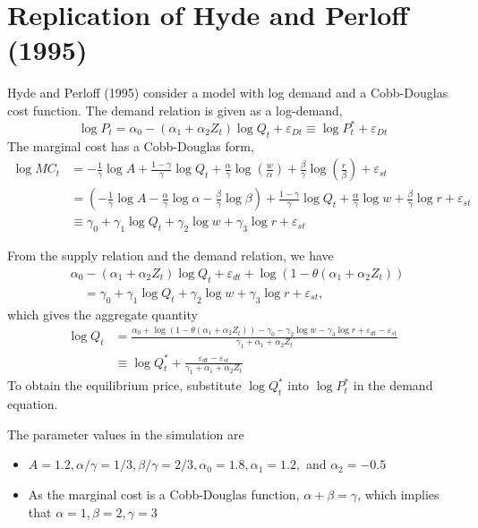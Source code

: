 \documentclass[11pt]{article}
\numberwithin{figure}{section}
\theoremstyle{definition}
\newcommand{\0}{\mathbf{0}}
\begin{document}
\section{Replication of Hyde and Perloff (1995)}
Hyde and Perloff (1995) consider a model with log demand and a Cobb-Douglas cost function. 
The demand relation is given as a log-demand, 
\[\log P_{t} = \alpha_0 - (\alpha_1 + \alpha_2 Z_t) \log Q_t + \varepsilon_{Dt} \equiv \log P_t^* + \varepsilon_{Dt}\]
The marginal cost has a Cobb-Douglas form,
\begin{align*}
    \log MC_t &= -\frac{1}{\gamma}\log A + \frac{1-\gamma}{\gamma}\log Q_t + \frac{\alpha}{\gamma} \log \left(\frac{w}{\alpha}\right) + \frac{\beta}{\gamma} \log \left(\frac{r}{\beta}\right) + \varepsilon_{st}\\
        & = \left( -\frac{1}{\gamma}\log A - \frac{\alpha}{\gamma}\log \alpha -  \frac{\beta}{\gamma}\log\beta    \right) + \frac{1-\gamma}{\gamma}\log Q_t + \frac{\alpha}{\gamma} \log w + \frac{\beta}{\gamma} \log r + \varepsilon_{st} \\
        &\equiv \gamma_0 + \gamma_1 \log Q_t +  \gamma_2 \log w + \gamma_3 \log r + \varepsilon_{st}
\end{align*}

From the supply relation and the demand relation, we have
\begin{align*}
   &\alpha_0 - (\alpha_1 + \alpha_2 Z_t)\log Q_t + \varepsilon_{dt} + \log (1 - \theta (\alpha_1 + \alpha_2 Z_t))\\
   &\quad = \gamma_0 + \gamma_1 \log Q_t +  \gamma_2 \log w + \gamma_3 \log r + \varepsilon_{st},
\end{align*}
which gives the aggregate quantity 
\begin{align*}
    \log Q_t &= \frac{ \alpha_0 + \log (1 - \theta (\alpha_1 + \alpha_2 Z_t)) - \gamma_0  -  \gamma_2 \log w - \gamma_3 \log r +  \varepsilon_{dt} - \varepsilon_{st}}{\gamma_1+ \alpha_1 + \alpha_2 Z_t}\\
    &\equiv \log Q_t^* + \frac{\varepsilon_{dt} - \varepsilon_{st}}{\gamma_1+ \alpha_1 + \alpha_2 Z_t}
\end{align*}
To obtain the equilibrium price, substitute $\log Q_t^*$ into $\log P_t^*$ in the demand equation.


The parameter values in the simulation are
\begin{itemize}
    \item $A = 1.2, \alpha/\gamma = 1/3, \beta/\gamma = 2/3, \alpha_0 = 1.8, \alpha_1 = 1.2,$ and $\alpha_2 = -0.5$
    \item As the marginal cost is a Cobb-Douglas function, $\alpha + \beta = \gamma $, which implies that $\alpha = 1, \beta = 2, \gamma = 3$
\end{itemize}
\end{document}
